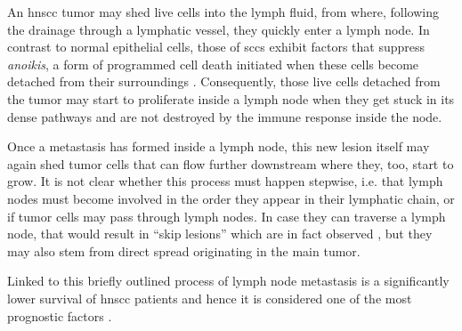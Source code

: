 \documentclass[\relativeRoot/main.tex]{subfiles}
\begin{document}
An \gls{hnscc} tumor may shed live cells into the lymph fluid, from where, following the drainage through a lymphatic vessel, they quickly enter a lymph node. In contrast to normal epithelial cells, those of \glspl{scc} exhibit factors that suppress \emph{anoikis}, a form of programmed cell death initiated when these cells become detached from their surroundings \cite{peltanova_effect_2019}. Consequently, those live cells detached from the tumor may start to proliferate inside a lymph node when they get stuck in its dense pathways and are not destroyed by the immune response inside the node.

Once a metastasis has formed inside a lymph node, this new lesion itself may again shed tumor cells that can flow further downstream where they, too, start to grow. It is not clear whether this process must happen stepwise, i.e. that lymph nodes must become involved in the order they appear in their lymphatic chain, or if tumor cells may pass through lymph nodes. In case they can traverse a lymph node, that would result in ``skip lesions'' which are in fact observed \cite{woolgar_topography_2007}, but they may also stem from direct spread originating in the main tumor.

Linked to this briefly outlined process of lymph node metastasis is a significantly lower survival of \gls{hnscc} patients and hence it is considered one of the most prognostic factors \cite{jones_level_1994,lim_distributions_2006,takes_staging_2004}.
\end{document}
